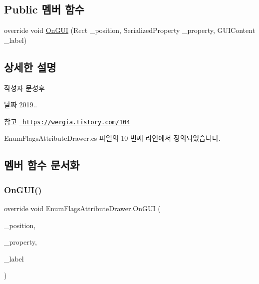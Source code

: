 \subsection*{Public 멤버 함수}
\begin{DoxyCompactItemize}
\item 
override void \mbox{\hyperlink{class_enum_flags_attribute_drawer_a4eec6e021fd9909ff723dc6fcde93e74}{On\+G\+UI}} (Rect \+\_\+position, Serialized\+Property \+\_\+property, G\+U\+I\+Content \+\_\+label)
\end{DoxyCompactItemize}


\subsection{상세한 설명}
\begin{DoxyAuthor}{작성자}
문성후 
\end{DoxyAuthor}
\begin{DoxyDate}{날짜}
2019.. 
\end{DoxyDate}
\begin{DoxySeeAlso}{참고}
\href{https://wergia.tistory.com/104}{\texttt{ https\+://wergia.\+tistory.\+com/104}} 
\end{DoxySeeAlso}


Enum\+Flags\+Attribute\+Drawer.\+cs 파일의 10 번째 라인에서 정의되었습니다.



\subsection{멤버 함수 문서화}
\mbox{\label{class_enum_flags_attribute_drawer_a4eec6e021fd9909ff723dc6fcde93e74}} 
\subsubsection{\texorpdfstring{OnGUI()}{OnGUI()}}
{\footnotesize\ttfamily override void Enum\+Flags\+Attribute\+Drawer.\+On\+G\+UI (\begin{DoxyParamCaption}\item[{Rect}]{\+\_\+position,  }\item[{Serialized\+Property}]{\+\_\+property,  }\item[{G\+U\+I\+Content}]{\+\_\+label }\end{DoxyParamCaption})\hspace{0.3cm}{\ttfamily [inline]}}



